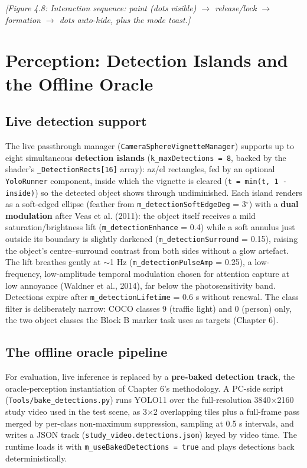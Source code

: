 \textit{[Figure 4.8: Interaction sequence: paint (dots visible) $\rightarrow$ release/lock $\rightarrow$ formation $\rightarrow$ dots
auto-hide, plus the mode toast.]}

\section{Perception: Detection Islands and the Offline Oracle}

\subsection{Live detection support}

The live passthrough manager (\verb|CameraSphereVignetteManager|) supports up to eight simultaneous
\textbf{detection islands} (\verb|k_maxDetections = 8|, backed by the shader's \verb|_DetectionRects[16]| array):
az/el rectangles, fed by an optional \verb|YoloRunner| component, inside which the vignette is cleared
(\verb|t = min(t, 1 - inside)|) so the detected object shows through undiminished. Each island renders as
a soft-edged ellipse (feather from \verb|m_detectionSoftEdgeDeg| = 3$^{\circ}$) with a \textbf{dual modulation} after
Veas et al. (2011): the object itself receives a mild saturation/brightness lift
(\verb|m_detectionEnhance| = 0.4) while a soft annulus just outside its boundary is slightly darkened
(\verb|m_detectionSurround| = 0.15), raising the object's centre–surround contrast from both sides
without a glow artefact. The lift breathes gently at $\sim$1 Hz (\verb|m_detectionPulseAmp| = 0.25), a
low-frequency, low-amplitude temporal modulation chosen for attention capture at low annoyance
(Waldner et al., 2014), far below the photosensitivity band. Detections expire after
\verb|m_detectionLifetime| = 0.6 s without renewal. The class filter is deliberately narrow: COCO
classes 9 (traffic light) and 0 (person) only, the two object classes the Block B marker task uses
as targets (Chapter 6).

\subsection{The offline oracle pipeline}

For evaluation, live inference is replaced by a \textbf{pre-baked detection track}, the oracle-perception
instantiation of Chapter 6's methodology. A PC-side script (\verb|Tools/bake_detections.py|) runs YOLO11
over the full-resolution 3840$\times$2160 study video used in the test scene, as 3$\times$2 overlapping tiles
plus a full-frame pass merged by per-class non-maximum suppression, sampling at 0.5 s intervals, and
writes a JSON track (\verb|study_video.detections.json|) keyed by video time. The runtime loads it with
\verb|m_useBakedDetections = true| and plays detections back deterministically.

